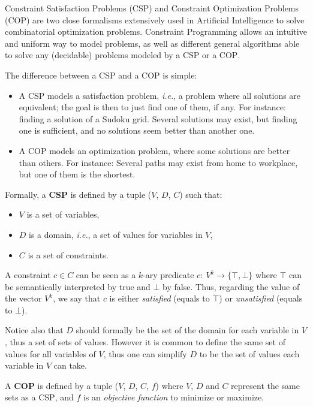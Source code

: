 \documentclass[journal]{IEEEtran}
\newcommand{\minormod}[1]{\color{red} #1\color{black} \xspace}
\newcommand{\csp}{\textsc{CSP}\xspace}
\newcommand{\cop}{\textsc{COP}\xspace}
\newcommand{\ie}{\textit{i.e.}}
\begin{document}
Constraint  Satisfaction Problems  (\csp) and  Constraint Optimization
Problems  (\cop)   are  two  close  formalisms   extensively  used  in
Artificial  Intelligence  to   solve  combinatorial    optimization
problems. Constraint  Programming allows an intuitive  and uniform way
to model  problems, as  well as different  general algorithms able to
solve any \minormod{(decidable)} problems modeled by a \csp or a \cop.

The difference between a \csp and a \cop is simple:
\begin{itemize}
\item A \csp  models a satisfaction problem, \ie, a  problem where all
  solutions are equivalent; the goal is then to just find one of them,
  if any. For  instance: finding a solution of a  Sudoku grid. Several
  solutions may exist, but finding one is sufficient, and no solutions
  seem better than another one.
\item A \cop models an  optimization problem, where some solutions are
  better than others.  For instance: Several paths may exist from home
  to workplace, but one of them is the shortest.
\end{itemize}
Formally, a {\bf \csp} is defined by a tuple ($V$, $D$, $C$) such that:
\begin{itemize}
\item $V$ is a set of variables,
\item $D$ is a domain, \ie, a set of values for variables in $V$,
\item $C$ is a set of constraints.
\end{itemize}

A  constraint  $c   \in  C$  can  be  seen  as   a  $k$-ary  predicate
$c:~V^k\rightarrow\{\top,\bot\}$  where  $\top$  can  be  semantically
interpreted by true and $\bot$ by  false. Thus, regarding the value of
the vector $V^k$, we say that $c$ is either {\it satisfied} (equals to
$\top$) or {\it unsatisfied} (equals to $\bot$).

Notice also that $D$ should formally be the set of the domain for each
variable in $V$, thus a set of  sets of values. However it is common to
define the same set  of values for all variables of  $V$, thus one can
simplify $D$ to be the set of values each variable in $V$ can take.

A {\bf \cop} is defined by a tuple ($V$, $D$, $C$, $f$) where $V$, $D$ and
$C$ represent the same sets as a \csp, and $f$ is an {\it objective
function} to minimize  or maximize.
\end{document}
